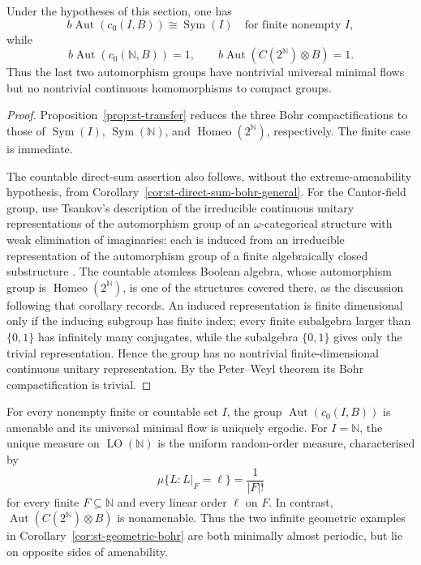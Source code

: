 \begin{corollary}\label{cor:st-geometric-bohr}
 Under the hypotheses of this section, one has 
\begin{equation*}
b\operatorname{Aut}(c_0(I,B))\cong\operatorname{Sym}(I)  \quad\text{for finite nonempty }I, 
\end{equation*}
while 
\begin{equation*}
b\operatorname{Aut}(c_0(\mathbb{N},B))=1,  \qquad  b\operatorname{Aut}(C(2^{\mathbb{N}})\otimes B)=1. 
\end{equation*}
Thus the last two automorphism groups have nontrivial universal minimal
flows but no nontrivial continuous homomorphisms to compact groups.
\end{corollary}

\begin{proof}
Proposition~\ref{prop:st-transfer} reduces the three Bohr compactifications to
those of $\operatorname{Sym}(I)$, $\operatorname{Sym}(\mathbb{N})$, and $\operatorname{Homeo}(2^{\mathbb{N}})$,
respectively. The finite case is immediate.

The countable direct-sum assertion also follows, without the extreme-amenability hypothesis, from Corollary~\ref{cor:st-direct-sum-bohr-general}. For the Cantor-field group, use Tsankov's description of the irreducible
continuous unitary representations of the automorphism group of an
$\omega$-categorical structure with weak elimination of imaginaries: each is
induced from an irreducible representation of the automorphism group of a
finite algebraically closed substructure \cite[Corollary~5.2]{Tsankov2012}. The countable atomless Boolean algebra, whose
automorphism group is $\operatorname{Homeo}(2^{\mathbb{N}})$, is one of the structures
covered there, as the discussion following that corollary records. An
induced representation is finite dimensional only if the inducing subgroup
has finite index; every finite subalgebra larger than $\{0,1\}$ has
infinitely many conjugates, while the subalgebra $\{0,1\}$ gives only the
trivial representation. Hence the group has no nontrivial finite-dimensional
continuous unitary representation. By the Peter--Weyl theorem its Bohr
compactification is trivial.
\end{proof}

\begin{corollary}\label{cor:st-geometric-amenability}
 For every nonempty finite or countable set 
$I$, the group $\operatorname{Aut}(c_0(I,B))$ is amenable and its universal minimal flow
is uniquely ergodic. For $I=\mathbb{N}$, the unique measure on $\operatorname{LO}(\mathbb{N})$ is the uniform random-order measure, characterised by 
\begin{equation*}
\mu\{L:L|_F=\ell\}=\frac1{|F|!} 
\end{equation*}
for every finite $F\subseteq\mathbb{N}$ and every linear order $\ell$ on $F$. In contrast, $\operatorname{Aut}(C(2^{\mathbb{N}})\otimes B)$ is nonamenable. Thus the
two infinite geometric examples in Corollary~\ref{cor:st-geometric-bohr} are
both minimally almost periodic, but lie on opposite sides of amenability.
\end{corollary}


